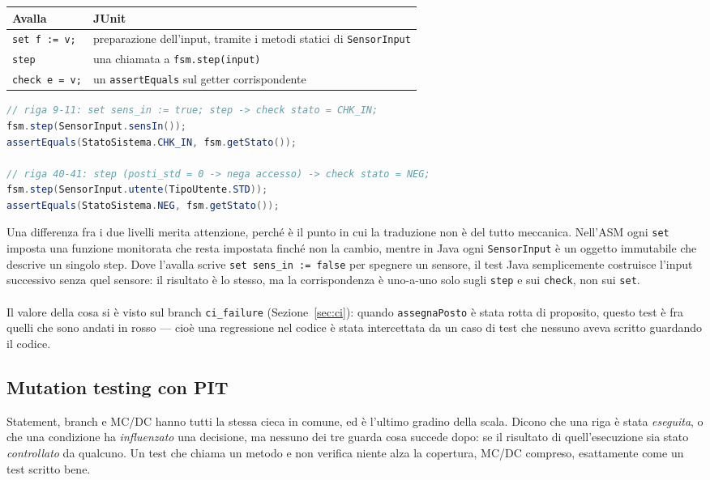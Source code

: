 \begin{longtable}{@{}p{4.2cm}p{9.5cm}@{}}
\toprule
\textbf{Avalla} & \textbf{JUnit} \\
\midrule
\endhead
\texttt{set f := v;} & preparazione dell'input, tramite i metodi statici di \texttt{SensorInput} \\
\texttt{step} & una chiamata a \texttt{fsm.step(input)} \\
\texttt{check e = v;} & un \texttt{assertEquals} sul getter corrispondente \\
\bottomrule
\end{longtable}

\begin{lstlisting}[language=Java, caption={Estratto di ScenarioAvallaTest: ogni blocco cita la riga dell'avalla}]
// riga 9-11: set sens_in := true; step -> check stato = CHK_IN;
fsm.step(SensorInput.sensIn());
assertEquals(StatoSistema.CHK_IN, fsm.getStato());

// riga 40-41: step (posti_std = 0 -> nega accesso) -> check stato = NEG;
fsm.step(SensorInput.utente(TipoUtente.STD));
assertEquals(StatoSistema.NEG, fsm.getStato());
\end{lstlisting}

Una differenza fra i due livelli merita attenzione, perché è il punto in cui la
traduzione non è del tutto meccanica. Nell'ASM ogni \texttt{set} imposta una funzione
monitorata che resta impostata finché non la cambio, mentre in Java ogni
\texttt{SensorInput} è un oggetto immutabile che descrive un singolo step. Dove l'avalla
scrive \texttt{set sens\_in := false} per spegnere un sensore, il test Java semplicemente
costruisce l'input successivo senza quel sensore: il risultato è lo stesso, ma la
corrispondenza è uno-a-uno solo sugli \texttt{step} e sui \texttt{check}, non sui
\texttt{set}.
\\ \\
Il valore della cosa si è visto sul branch \texttt{ci\_failure} (Sezione~\ref{sec:ci}):
quando \texttt{assegnaPosto} è stata rotta di proposito, questo test è fra quelli che sono
andati in rosso — cioè una regressione nel codice è stata intercettata da un caso di test
che nessuno aveva scritto guardando il codice.

\subsection{Mutation testing con PIT}
\label{sec:mutation}

Statement, branch e MC/DC hanno tutti la stessa cieca in comune, ed è l'ultimo gradino
della scala. Dicono che una riga è stata \emph{eseguita}, o che una condizione ha
\emph{influenzato} una decisione, ma nessuno dei tre guarda cosa succede dopo: se il
risultato di quell'esecuzione sia stato \emph{controllato} da qualcuno. Un test che chiama
un metodo e non verifica niente alza la copertura, MC/DC compreso, esattamente come un
test scritto bene.

